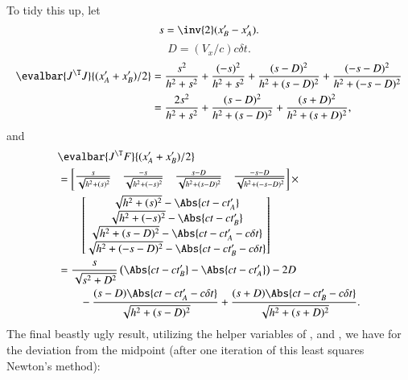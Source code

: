 To tidy this up, let
\begin{equation}\label{eqn:relativisticElectrodynamicsA1:391}
s = \inv{2} (x_B' - x_A').
\end{equation}
\begin{equation}\label{eqn:relativisticElectrodynamicsA1:392}
D = (V_x/c) c \delta t.
\end{equation}
\begin{equation}\label{eqn:relElectroDynProblemSet1:1500}
\begin{aligned}
\evalbar{J^\T J}{(x_A' + x_B')/2}
&=
\frac{s^2}{h^2 + s^2}
+\frac{(-s)^2}{h^2 + s^2}
+\frac{(s - D)^2}{h^2 + (s -D)^2}
+\frac{(-s - D)^2}{h^2 + (-s -D)^2} \\
&=
\frac{2 s^2}{h^2 + s^2}
+\frac{(s - D)^2}{h^2 + (s -D)^2}
+\frac{(s + D)^2}{h^2 + (s +D)^2},
\end{aligned}
\end{equation}
and
\begin{dmath}\label{eqn:relElectroDynProblemSet1:1520}
\begin{aligned}
&\evalbar{J^\T F}{(x_A' + x_B')/2}  \\
&=
\begin{bmatrix}
\frac{s}{\sqrt{ h^2 + (s)^2 } } &
\frac{-s}{\sqrt{ h^2 + (-s)^2 } } &
\frac{s - D}{\sqrt{ h^2 + (s - D)^2 } } &
\frac{-s - D}{\sqrt{ h^2 + (-s - D)^2 } }
\end{bmatrix}  \times \\
&\qquad
\begin{bmatrix}
\sqrt{ h^2 + (s)^2 } - \Abs{c t - c t_A'} \\
\sqrt{ h^2 + (-s)^2 } - \Abs{c t - c t_B'} \\
\sqrt{ h^2 + (s - D)^2 } - \Abs{c t - c t_A' - c \delta t} \\
\sqrt{ h^2 + (-s - D)^2 } - \Abs{c t - c t_B' - c \delta t} \\
\end{bmatrix}  \\
&=
\frac{s}{\sqrt{s^2 + D^2}} \left( \Abs{ ct - c t_B' } - \Abs{ c t - c t_A'} \right)
-2 D \\
&\qquad - \frac{(s - D)\Abs{c t - c t_A' - c \delta t} }{ \sqrt{ h^2 + (s - D)^2 } }
+ \frac{(s + D)\Abs{c t - c t_B' - c \delta t} }{ \sqrt{ h^2 + (s + D)^2 } }.
\end{aligned}
\end{dmath}
The final beastly ugly result, utilizing the helper variables of , and , we have for the deviation from the midpoint (after one iteration of this least squares Newton's method):
